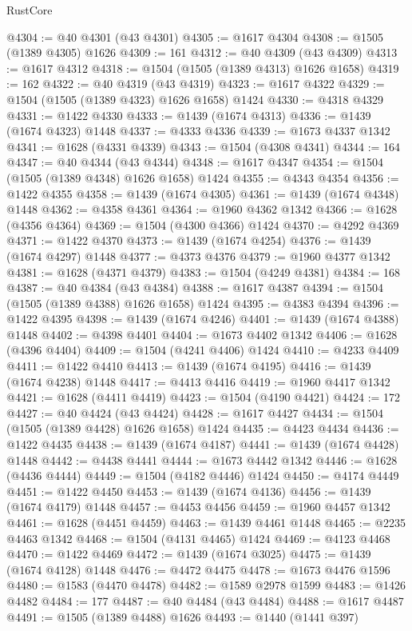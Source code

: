 \begin{lexlean}{RustCore}
\begin{coremodule}
@4304 := @40 @4301 (@43 @4301)
@4305 := @1617 @4304
@4308 := @1505 (@1389 @4305) @1626
@4309 := 161
@4312 := @40 @4309 (@43 @4309)
@4313 := @1617 @4312
@4318 := @1504 (@1505 (@1389 @4313) @1626 @1658)
@4319 := 162
@4322 := @40 @4319 (@43 @4319)
@4323 := @1617 @4322
@4329 := @1504 (@1505 (@1389 @4323) @1626 @1658) @1424
@4330 := @4318 @4329
@4331 := @1422 @4330
@4333 := @1439 (@1674 @4313)
@4336 := @1439 (@1674 @4323) @1448
@4337 := @4333 @4336
@4339 := @1673 @4337 @1342
@4341 := @1628 (@4331 @4339)
@4343 := @1504 (@4308 @4341)
@4344 := 164
@4347 := @40 @4344 (@43 @4344)
@4348 := @1617 @4347
@4354 := @1504 (@1505 (@1389 @4348) @1626 @1658) @1424
@4355 := @4343 @4354
@4356 := @1422 @4355
@4358 := @1439 (@1674 @4305)
@4361 := @1439 (@1674 @4348) @1448
@4362 := @4358 @4361
@4364 := @1960 @4362 @1342
@4366 := @1628 (@4356 @4364)
@4369 := @1504 (@4300 @4366) @1424
@4370 := @4292 @4369
@4371 := @1422 @4370
@4373 := @1439 (@1674 @4254)
@4376 := @1439 (@1674 @4297) @1448
@4377 := @4373 @4376
@4379 := @1960 @4377 @1342
@4381 := @1628 (@4371 @4379)
@4383 := @1504 (@4249 @4381)
@4384 := 168
@4387 := @40 @4384 (@43 @4384)
@4388 := @1617 @4387
@4394 := @1504 (@1505 (@1389 @4388) @1626 @1658) @1424
@4395 := @4383 @4394
@4396 := @1422 @4395
@4398 := @1439 (@1674 @4246)
@4401 := @1439 (@1674 @4388) @1448
@4402 := @4398 @4401
@4404 := @1673 @4402 @1342
@4406 := @1628 (@4396 @4404)
@4409 := @1504 (@4241 @4406) @1424
@4410 := @4233 @4409
@4411 := @1422 @4410
@4413 := @1439 (@1674 @4195)
@4416 := @1439 (@1674 @4238) @1448
@4417 := @4413 @4416
@4419 := @1960 @4417 @1342
@4421 := @1628 (@4411 @4419)
@4423 := @1504 (@4190 @4421)
@4424 := 172
@4427 := @40 @4424 (@43 @4424)
@4428 := @1617 @4427
@4434 := @1504 (@1505 (@1389 @4428) @1626 @1658) @1424
@4435 := @4423 @4434
@4436 := @1422 @4435
@4438 := @1439 (@1674 @4187)
@4441 := @1439 (@1674 @4428) @1448
@4442 := @4438 @4441
@4444 := @1673 @4442 @1342
@4446 := @1628 (@4436 @4444)
@4449 := @1504 (@4182 @4446) @1424
@4450 := @4174 @4449
@4451 := @1422 @4450
@4453 := @1439 (@1674 @4136)
@4456 := @1439 (@1674 @4179) @1448
@4457 := @4453 @4456
@4459 := @1960 @4457 @1342
@4461 := @1628 (@4451 @4459)
@4463 := @1439 @4461 @1448
@4465 := @2235 @4463 @1342
@4468 := @1504 (@4131 @4465) @1424
@4469 := @4123 @4468
@4470 := @1422 @4469
@4472 := @1439 (@1674 @3025)
@4475 := @1439 (@1674 @4128) @1448
@4476 := @4472 @4475
@4478 := @1673 @4476 @1596
@4480 := @1583 (@4470 @4478)
@4482 := @1589 @2978 @1599
@4483 := @1426 @4482
@4484 := 177
@4487 := @40 @4484 (@43 @4484)
@4488 := @1617 @4487
@4491 := @1505 (@1389 @4488) @1626
@4493 := @1440 (@1441 @397)

\end{coremodule}
\end{lexlean}
